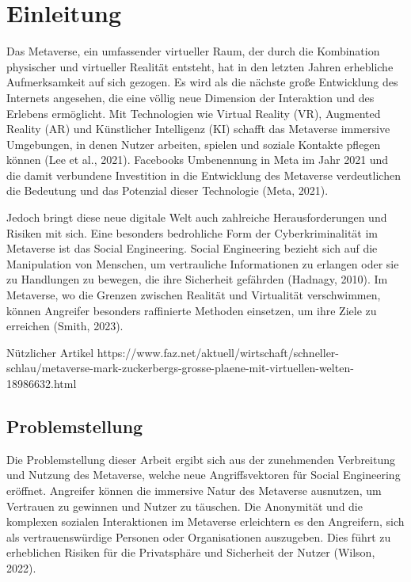 \chapter{Einleitung}\label{ch:Einleitung}

Das Metaverse, ein umfassender virtueller Raum, der durch die Kombination physischer und virtueller Realität entsteht, hat in den letzten Jahren erhebliche Aufmerksamkeit auf sich gezogen. Es wird als die nächste große Entwicklung des Internets angesehen, die eine völlig neue Dimension der Interaktion und des Erlebens ermöglicht. Mit Technologien wie Virtual Reality (VR), Augmented Reality (AR) und Künstlicher Intelligenz (KI) schafft das Metaverse immersive Umgebungen, in denen Nutzer arbeiten, spielen und soziale Kontakte pflegen können (Lee et al., 2021). Facebooks Umbenennung in Meta im Jahr 2021 und die damit verbundene Investition in die Entwicklung des Metaverse verdeutlichen die Bedeutung und das Potenzial dieser Technologie (Meta, 2021).

Jedoch bringt diese neue digitale Welt auch zahlreiche Herausforderungen und Risiken mit sich. Eine besonders bedrohliche Form der Cyberkriminalität im Metaverse ist das Social Engineering. Social Engineering bezieht sich auf die Manipulation von Menschen, um vertrauliche Informationen zu erlangen oder sie zu Handlungen zu bewegen, die ihre Sicherheit gefährden (Hadnagy, 2010). Im Metaverse, wo die Grenzen zwischen Realität und Virtualität verschwimmen, können Angreifer besonders raffinierte Methoden einsetzen, um ihre Ziele zu erreichen (Smith, 2023).

Nützlicher Artikel https://www.faz.net/aktuell/wirtschaft/schneller-schlau/metaverse-mark-zuckerbergs-grosse-plaene-mit-virtuellen-welten-18986632.html

\section{Problemstellung}
Die Problemstellung dieser Arbeit ergibt sich aus der zunehmenden Verbreitung und Nutzung des Metaverse, welche neue Angriffsvektoren für Social Engineering eröffnet. Angreifer können die immersive Natur des Metaverse ausnutzen, um Vertrauen zu gewinnen und Nutzer zu täuschen. Die Anonymität und die komplexen sozialen Interaktionen im Metaverse erleichtern es den Angreifern, sich als vertrauenswürdige Personen oder Organisationen auszugeben. Dies führt zu erheblichen Risiken für die Privatsphäre und Sicherheit der Nutzer (Wilson, 2022).

